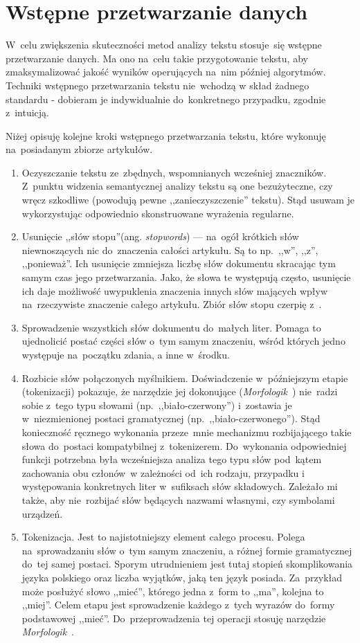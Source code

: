 \documentclass[pl]{minipw} %
\begin{document}
\section{Wstępne przetwarzanie danych}

W~celu zwiększenia skuteczności metod analizy tekstu stosuje~się wstępne przetwarzanie danych. Ma ono na~celu takie przygotowanie tekstu, aby zmaksymalizować jakość wyników operujących na~nim później algorytmów. Techniki wstępnego przetwarzania tekstu nie~wchodzą w skład żadnego standardu - dobieram je indywidualnie do~konkretnego przypadku, zgodnie z~intuicją.

Niżej opisuję kolejne kroki wstępnego przetwarzania tekstu, które wykonuję na~posiadanym zbiorze artykułów.
\begin{enumerate}
	\item Oczyszczanie tekstu ze~zbędnych, wspomnianych wcześniej znaczników. Z~punktu widzenia semantycznej analizy tekstu są one bezużyteczne, czy wręcz szkodliwe (powodują pewne ,,zanieczyszczenie'' tekstu). Stąd usuwam je wykorzystując odpowiednio skonstruowane wyrażenia regularne.
	\item Usunięcie ,,słów stopu''(ang. \textit{stopwords}) --- na~ogół krótkich słów niewnoszących nic do~znaczenia całości artykułu. Są to np.~,,w'', ,,z'', ,,ponieważ''. Ich usunięcie zmniejsza liczbę słów dokumentu skracając tym samym czas jego przetwarzania. Jako, że słowa te występują często, usunięcie ich daje możliwość uwypuklenia znaczenia innych słów mających wpływ na~rzeczywiste znaczenie całego artykułu. Zbiór słów stopu czerpię z~\cite{stopwords}.
\item Sprowadzenie wszystkich słów dokumentu do~małych liter. Pomaga to ujednolicić postać części słów o~tym samym znaczeniu, wśród których jedno występuje na~początku zdania, a inne w~środku.
	\item Rozbicie słów połączonych myślnikiem. Doświadczenie w~późniejszym etapie (tokenizacji) pokazuje, że narzędzie jej dokonujące (\textit{Morfologik}~\cite{morfologik}) nie~radzi sobie z~tego typu słowami (np.~,,biało-czerwony'') i~zostawia je w~niezmienionej postaci gramatycznej (np.~,,biało-czerwonego''). Stąd konieczność ręcznego wykonania przeze~mnie mechanizmu rozbijającego takie słowa do~postaci kompatybilnej z~tokenizerem. Do~wykonania odpowiedniej funkcji potrzebna była wcześniejsza analiza tego typu słów pod~kątem zachowania obu członów~w zależności od~ich rodzaju, przypadku i występowania konkretnych liter w~sufiksach słów składowych. Zależało mi także, aby nie~rozbijać słów będących nazwami własnymi, czy symbolami urządzeń.
\item Tokenizacja. Jest to najistotniejszy element całego procesu. Polega na~sprowadzaniu słów o~tym samym znaczeniu, a różnej formie gramatycznej do~tej samej postaci. Sporym utrudnieniem jest tutaj stopień skomplikowania języka polskiego oraz liczba wyjątków, jaką ten język posiada. Za~przykład może posłużyć słowo ,,mieć'', którego jedna z~form to ,,ma'', kolejna to ,,miej''. Celem etapu jest sprowadzenie każdego z~tych wyrazów do~formy podstawowej ,,mieć''. Do~przeprowadzenia tej operacji stosuję narzędzie \textit{Morfologik}~\cite{morfologik}.
\end{enumerate}
\end{document}
